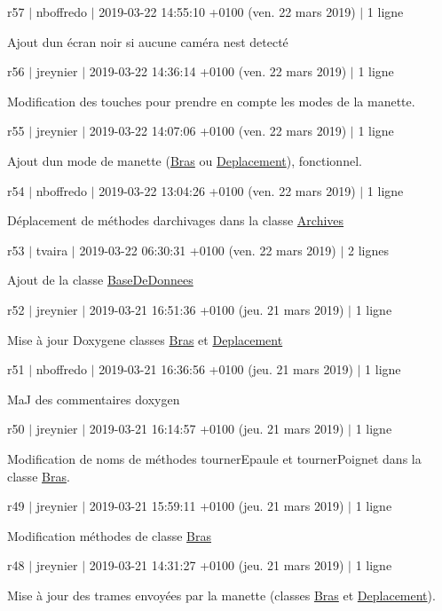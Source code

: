 r57 $\vert$ nboffredo $\vert$ 2019-\/03-\/22 14\+:55\+:10 +0100 (ven. 22 mars 2019) $\vert$ 1 ligne

Ajout d\textquotesingle{}un écran noir si aucune caméra n\textquotesingle{}est detecté

r56 $\vert$ jreynier $\vert$ 2019-\/03-\/22 14\+:36\+:14 +0100 (ven. 22 mars 2019) $\vert$ 1 ligne

Modification des touches pour prendre en compte les modes de la manette.

r55 $\vert$ jreynier $\vert$ 2019-\/03-\/22 14\+:07\+:06 +0100 (ven. 22 mars 2019) $\vert$ 1 ligne

Ajout d\textquotesingle{}un mode de manette (\hyperlink{class_bras}{Bras} ou \hyperlink{class_deplacement}{Deplacement}), fonctionnel.

r54 $\vert$ nboffredo $\vert$ 2019-\/03-\/22 13\+:04\+:26 +0100 (ven. 22 mars 2019) $\vert$ 1 ligne

Déplacement de méthodes d\textquotesingle{}archivages dans la classe \hyperlink{class_archives}{Archives}

r53 $\vert$ tvaira $\vert$ 2019-\/03-\/22 06\+:30\+:31 +0100 (ven. 22 mars 2019) $\vert$ 2 lignes

Ajout de la classe \hyperlink{class_base_de_donnees}{Base\+De\+Donnees}

r52 $\vert$ jreynier $\vert$ 2019-\/03-\/21 16\+:51\+:36 +0100 (jeu. 21 mars 2019) $\vert$ 1 ligne

Mise à jour Doxygene classes \hyperlink{class_bras}{Bras} et \hyperlink{class_deplacement}{Deplacement}

r51 $\vert$ nboffredo $\vert$ 2019-\/03-\/21 16\+:36\+:56 +0100 (jeu. 21 mars 2019) $\vert$ 1 ligne

MaJ des commentaires doxygen

r50 $\vert$ jreynier $\vert$ 2019-\/03-\/21 16\+:14\+:57 +0100 (jeu. 21 mars 2019) $\vert$ 1 ligne

Modification de noms de méthodes tourner\+Epaule et tourner\+Poignet dans la classe \hyperlink{class_bras}{Bras}.

r49 $\vert$ jreynier $\vert$ 2019-\/03-\/21 15\+:59\+:11 +0100 (jeu. 21 mars 2019) $\vert$ 1 ligne

Modification méthodes de classe \hyperlink{class_bras}{Bras}

r48 $\vert$ jreynier $\vert$ 2019-\/03-\/21 14\+:31\+:27 +0100 (jeu. 21 mars 2019) $\vert$ 1 ligne

Mise à jour des trames envoyées par la manette (classes \hyperlink{class_bras}{Bras} et \hyperlink{class_deplacement}{Deplacement}).

